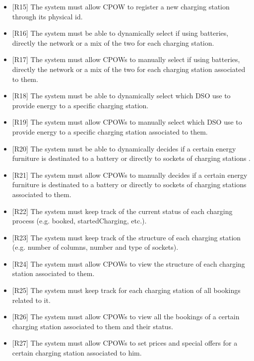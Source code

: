 \documentclass[a4paper]{report}
\begin{document}
\begin{itemize}
    \item{[R15]} \label{R15} The system must allow CPOW to register a new charging station through its physical id.
    \item{[R16]} \label{R16} The system must be able to dynamically select if using batteries, directly the network or a mix of the two for each charging station.
    \item{[R17]} \label{R17} The system must allow CPOWs to manually select if using batteries, directly the network or a mix of the two for each charging station associated to them.
    \item{[R18]} \label{R18} The system must be able to dynamically select which DSO use to provide energy to a specific charging station.
    \item{[R19]} \label{R19} The system must allow CPOWs to manually select which DSO use to provide energy to a specific charging station associated to them.
    \item{[R20]} \label{R20} The system must be able to dynamically decides if a certain energy furniture is destinated to a battery or directly to sockets of charging stations .
    \item{[R21]} \label{R21} The system must allow CPOWs to manually decides if a certain energy furniture is destinated to a battery or directly to sockets of charging stations associated to them.
    \item{[R22]} \label{R22} The system must keep track of the current status of each charging process (e.g. booked, startedCharging, etc.).
    \item{[R23]} \label{R23} The system must keep track of the structure of each charging station (e.g. number of columns, number and type of sockets).
    \item{[R24]} \label{R24} The system must allow CPOWs to view the structure of each charging station associated to them.
    \item{[R25]} \label{R25} The system must keep track for each charging station of all bookings related to it.
    \item{[R26]} \label{R26} The system must allow CPOWs to view all the bookings of a certain charging station associated to them and their status.
    \item{[R27]} \label{R27} The system must allow CPOWs to set prices and special offers for a certain charging station associated to him.
\end{itemize}
\end{document}
